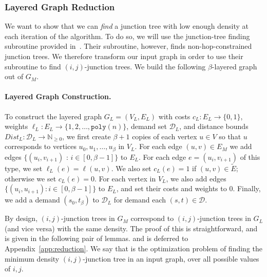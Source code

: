 \subsubsection{Layered Graph Reduction} \label{sec:layered_reduction}
We want to show that we can \textit{find} a junction tree with low enough density at each iteration of the algorithm. To do so, we will use the junction-tree finding subroutine provided in~\cite{GKL23}. Their subroutine, however, finds non-hop-constrained junction trees. We therefore transform our input graph in order to use their subroutine to find $(i,j)$-junction trees. We build the following $\beta$-layered graph out of $G_M$. 

\paragraph{Layered Graph Construction.} To construct the layered graph $G_L = (V_L, E_L)$ with costs $c_L : E_L \rightarrow \{0,1\}$, weights $\ell_L : E_L \rightarrow \{1, 2, \dots, \texttt{poly}(n) \}$, demand set $\mathcal{D}_L$, and distance bounds $Dist_L : \mathcal{D}_L \rightarrow \mathbb{N}_{\geq 0}$, 
we first create $\beta + 1$ copies of each vertex $u \in V$ so that $u$ corresponds to vertices $u_0, u_1, \dots, u_{\beta}$ in $V_L$.
For each edge $(u,v) \in E_M$ we add edges $\{ (u_i, v_{i+1})$ : $i \in [0, \beta-1] \}$ to $E_L$. 
For each edge $e = (u_i, v_{i+1})$ of this type, we set $\ell_{L}(e) = \ell(u,v)$. We also set $c_{L}(e) = 1$ if $(u,v) \in \widetilde{E}$; otherwise we set $c_{L}(e) = 0$.  
For each vertex in $V_L$, we also add edges $\{ (u_i, u_{i+1}) : i \in [0, \beta-1]  \}$ to $E_L$, and set their costs and weights to $0$. 
Finally, we add a demand $(s_0, t_\beta)$ to $\mathcal{D}_L$ for demand each $(s,t) \in \mathcal{D}$.


By design, $(i,j)$-junction trees in $G_M$ correspond to $(i,j)$-junction trees in $G_L$ (and vice versa) with the same density. The proof of this is straightforward, \iflong and is given in the following pair of lemmas. \else and is deferred to Appendix~\ref{app:reduction}. We say that {\jt} is the optimization problem of finding the minimum density $(i,j)$-junction tree in an input graph, over all possible values of $i,j$. \fi

